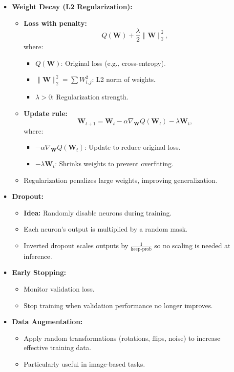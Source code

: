 \documentclass{article}
\begin{document}
\begin{itemize}
    \item \textbf{Weight Decay (L2 Regularization):}
    \begin{itemize}
        \item \textbf{Loss with penalty:}
        \[
        Q(\mathbf{W}) + \frac{\lambda}{2}\|\mathbf{W}\|_2^2,
        \]
        where:
        \begin{itemize}
            \item \(Q(\mathbf{W})\): Original loss (e.g., cross-entropy).
            \item \(\|\mathbf{W}\|_2^2 = \sum W_{i,j}^2\): L2 norm of weights.
            \item \(\lambda > 0\): Regularization strength.
        \end{itemize}
        \item \textbf{Update rule:}
        \[
        \mathbf{W}_{t+1} = \mathbf{W}_t - \alpha \nabla_{\mathbf{W}} Q(\mathbf{W}_t) - \lambda \mathbf{W}_t,
        \]
        where:
        \begin{itemize}
            \item \(-\alpha \nabla_{\mathbf{W}} Q(\mathbf{W}_t)\): Update to reduce original loss.
            \item \(-\lambda \mathbf{W}_t\): Shrinks weights to prevent overfitting.
        \end{itemize}
        \item Regularization penalizes large weights, improving generalization.
    \end{itemize}
    \item \textbf{Dropout:}
    \begin{itemize}
        \item \textbf{Idea:} Randomly disable neurons during training.
        \item Each neuron's output is multiplied by a random mask.
        \item Inverted dropout scales outputs by \(\frac{1}{\text{keep-prob}}\) so no scaling is needed at inference.
    \end{itemize}
    \item \textbf{Early Stopping:}
    \begin{itemize}
        \item Monitor validation loss.
        \item Stop training when validation performance no longer improves.
    \end{itemize}
    \item \textbf{Data Augmentation:}
    \begin{itemize}
        \item Apply random transformations (rotations, flips, noise) to increase effective training data.
        \item Particularly useful in image-based tasks.
    \end{itemize}
\end{itemize}
\end{document}
